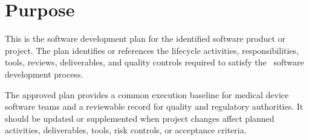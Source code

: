 \section{Purpose}
This is the software development plan for the identified software product or
project.  The plan identifies or references the lifecycle activities,
responsibilities, tools, reviews, deliverables, and quality controls required to
satisfy the \autodocCompanyName\ software development process.

\tlcVspace

The approved plan provides a common execution baseline for medical device
software teams and a reviewable record for quality and regulatory authorities.
It should be updated or supplemented when project changes affect planned
activities, deliverables, tools, risk controls, or acceptance criteria.
